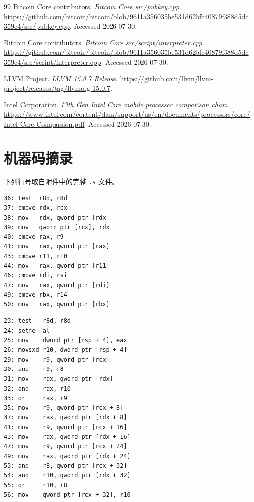 \documentclass[UTF8,a4paper,zihao=-4]{ctexart}
\begin{document}
\begin{thebibliography}{99}
Bitcoin Core contributors.
\newblock \emph{Bitcoin Core src/pubkey.cpp}.
\newblock \url{https://github.com/bitcoin/bitcoin/blob/9611a356035be531d62bfc40879f388d5dc359c4/src/pubkey.cpp}.
\newblock Accessed 2026-07-30.

Bitcoin Core contributors.
\newblock \emph{Bitcoin Core src/script/interpreter.cpp}.
\newblock \url{https://github.com/bitcoin/bitcoin/blob/9611a356035be531d62bfc40879f388d5dc359c4/src/script/interpreter.cpp}.
\newblock Accessed 2026-07-30.

LLVM Project.
\newblock \emph{LLVM 15.0.7 Release}.
\newblock \url{https://github.com/llvm/llvm-project/releases/tag/llvmorg-15.0.7}.

Intel Corporation.
\newblock \emph{13th Gen Intel Core mobile processor comparison chart}.
\newblock \url{https://www.intel.com/content/dam/support/us/en/documents/processors/core/Intel-Core-Comparsion.pdf}.
\newblock Accessed 2026-07-30.
\end{thebibliography}

\clearpage
\appendix
\section{机器码摘录}

下列行号取自附件中的完整 \texttt{.s} 文件。

\begin{lstlisting}[style=ShellStyle,caption={pr1257\_actual\_before\_bool\_win\_O2.s，第 36--50 行},basicstyle=\scriptsize\ttfamily]
36: test  r8d, r8d
37: cmove rdx, rcx
38: mov   rdx, qword ptr [rdx]
39: mov   qword ptr [rcx], rdx
40: cmove rax, r9
41: mov   rax, qword ptr [rax]
43: cmove r11, r10
44: mov   rax, qword ptr [r11]
46: cmove rdi, rsi
47: mov   rax, qword ptr [rdi]
49: cmove rbx, r14
50: mov   rax, qword ptr [rbx]
\end{lstlisting}

\begin{lstlisting}[style=ShellStyle,caption={pr1257\_actual\_after\_bool\_win\_O2.s，第 23--56 行},basicstyle=\scriptsize\ttfamily]
23: test   r8d, r8d
24: setne  al
25: mov    dword ptr [rsp + 4], eax
26: movsxd r10, dword ptr [rsp + 4]
29: mov    r9, qword ptr [rcx]
30: and    r9, r8
31: mov    rax, qword ptr [rdx]
32: and    rax, r10
33: or     rax, r9
35: mov    r9, qword ptr [rcx + 8]
37: mov    rax, qword ptr [rdx + 8]
41: mov    r9, qword ptr [rcx + 16]
43: mov    rax, qword ptr [rdx + 16]
47: mov    r9, qword ptr [rcx + 24]
49: mov    rax, qword ptr [rdx + 24]
53: and    r8, qword ptr [rcx + 32]
54: and    r10, qword ptr [rdx + 32]
55: or     r10, r8
56: mov    qword ptr [rcx + 32], r10
\end{lstlisting}
\end{document}
